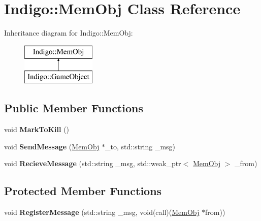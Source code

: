 \hypertarget{class_indigo_1_1_mem_obj}{}\section{Indigo\+:\+:Mem\+Obj Class Reference}
\label{class_indigo_1_1_mem_obj}
Inheritance diagram for Indigo\+:\+:Mem\+Obj\+:\begin{figure}[H]
\begin{center}
\leavevmode
\includegraphics[height=2.000000cm]{class_indigo_1_1_mem_obj}
\end{center}
\end{figure}
\subsection*{Public Member Functions}
\begin{DoxyCompactItemize}
\item 
\mbox{\label{class_indigo_1_1_mem_obj_a36b1eb75290fdb4aae51b557660f521d}} 
void {\bfseries Mark\+To\+Kill} ()
\item 
\mbox{\label{class_indigo_1_1_mem_obj_ad69aa8beafdf695d1e54b6f96dc2b2da}} 
void {\bfseries Send\+Message} (\hyperlink{class_indigo_1_1_mem_obj}{Mem\+Obj} $\ast$\+\_\+to, std\+::string \+\_\+msg)
\item 
\mbox{\label{class_indigo_1_1_mem_obj_a71ab9a36e458eb1415016f80c486c48b}} 
void {\bfseries Recieve\+Message} (std\+::string \+\_\+msg, std\+::weak\+\_\+ptr$<$ \hyperlink{class_indigo_1_1_mem_obj}{Mem\+Obj} $>$ \+\_\+from)
\end{DoxyCompactItemize}
\subsection*{Protected Member Functions}
\begin{DoxyCompactItemize}
\item 
\mbox{\label{class_indigo_1_1_mem_obj_af1d22b7153149088a46a67f1da54b7ab}} 
void {\bfseries Register\+Message} (std\+::string \+\_\+msg, void(call)(\hyperlink{class_indigo_1_1_mem_obj}{Mem\+Obj} $\ast$from))
\end{DoxyCompactItemize}
